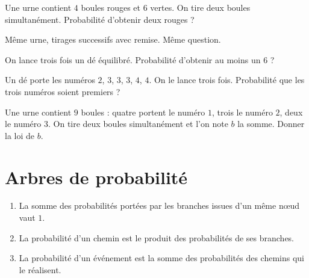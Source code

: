 \begin{entrainement}
\exo[\niveau{1}] Une urne contient $4$ boules rouges et $6$ vertes. On tire
deux boules simultanément. Probabilité d'obtenir deux rouges ?

\exo[\niveau{1}] Même urne, tirages successifs avec remise. Même question.

\exo[\niveau{2}] On lance trois fois un dé équilibré. Probabilité d'obtenir au
moins un $6$ ?

\exo[\niveau{2}] Un dé porte les numéros $2$, $3$, $3$, $3$, $4$, $4$. On le
lance trois fois. Probabilité que les trois numéros soient premiers ?

\exo[\niveau{3}] Une urne contient $9$ boules : quatre portent le numéro $1$,
trois le numéro $2$, deux le numéro $3$. On tire deux boules simultanément et
l'on note $b$ la somme. Donner la loi de $b$.
\end{entrainement}

\section{Arbres de probabilité}

\begin{propriete}
\begin{enumerate}[label=\textbf{\arabic*.}, leftmargin=*, itemsep=0.15em]
  \item La somme des probabilités portées par les branches issues d'un même
        n\oe ud vaut $1$.
  \item La probabilité d'un chemin est le produit des probabilités de ses
        branches.
  \item La probabilité d'un événement est la somme des probabilités des
        chemins qui le réalisent.
\end{enumerate}
\end{propriete}

